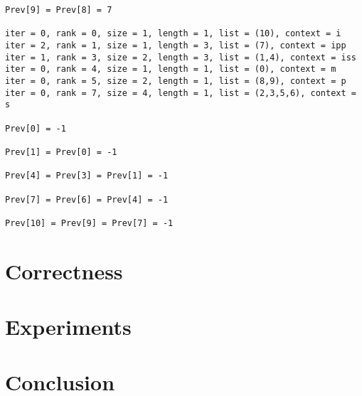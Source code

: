 \documentclass{article}
\begin{document}
\begin{verbatim}
Prev[9] = Prev[8] = 7

iter = 0, rank = 0, size = 1, length = 1, list = (10), context = i
iter = 2, rank = 1, size = 1, length = 3, list = (7), context = ipp
iter = 1, rank = 3, size = 2, length = 3, list = (1,4), context = iss
iter = 0, rank = 4, size = 1, length = 1, list = (0), context = m
iter = 0, rank = 5, size = 2, length = 1, list = (8,9), context = p
iter = 0, rank = 7, size = 4, length = 1, list = (2,3,5,6), context = s

Prev[0] = -1

Prev[1] = Prev[0] = -1

Prev[4] = Prev[3] = Prev[1] = -1

Prev[7] = Prev[6] = Prev[4] = -1

Prev[10] = Prev[9] = Prev[7] = -1
\end{verbatim}

\section{Correctness}
\label{sec:correc}

\section{Experiments}
\label{sec:expe}

\section{Conclusion}
\label{sec:conclu}
\end{document}
